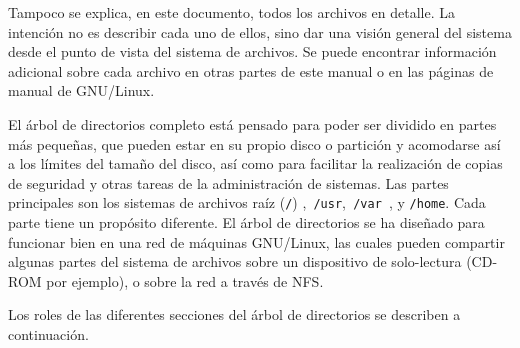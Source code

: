 

Tampoco se explica, en este documento, todos los archivos en detalle. La
intención no es describir cada uno de ellos, sino dar una visión general del
sistema desde el punto de vista del sistema de archivos.  Se puede encontrar
información adicional sobre cada archivo en otras partes de este manual o en las
páginas de manual de GNU/Linux.  

El árbol de directorios completo está pensado para poder ser dividido en
partes más pequeñas, que pueden estar en su propio disco o partición y
acomodarse así a los límites del tamaño del disco, así como para facilitar la
realización de  copias de seguridad y otras tareas de la administración de
sistemas. Las partes principales son los sistemas de archivos raíz
(\texttt{/}) ,\texttt{ /usr},\texttt{ /var
}, y \texttt{/home}. Cada parte tiene un propósito
diferente. El árbol de directorios se ha diseñado para funcionar bien en una red
de máquinas GNU/Linux, las cuales pueden compartir algunas partes del sistema de
archivos sobre un dispositivo de solo-lectura (CD-ROM por ejemplo), o sobre la
red a través de NFS.  




 Los roles de las diferentes secciones del árbol de directorios se
describen a continuación.  

